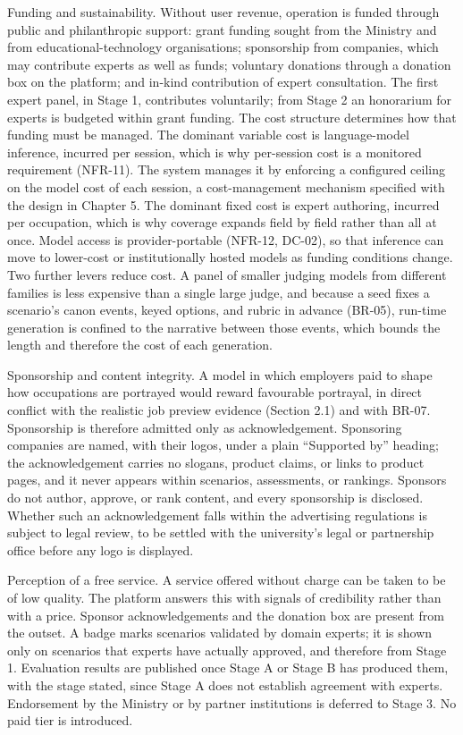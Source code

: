 Funding and sustainability. Without user revenue, operation is funded through public and philanthropic support: grant funding sought from the Ministry and from educational-technology organisations; sponsorship from companies, which may contribute experts as well as funds; voluntary donations through a donation box on the platform; and in-kind contribution of expert consultation. The first expert panel, in Stage 1, contributes voluntarily; from Stage 2 an honorarium for experts is budgeted within grant funding. The cost structure determines how that funding must be managed. The dominant variable cost is language-model inference, incurred per session, which is why per-session cost is a monitored requirement (NFR-11). The system manages it by enforcing a configured ceiling on the model cost of each session, a cost-management mechanism specified with the design in Chapter 5. The dominant fixed cost is expert authoring, incurred per occupation, which is why coverage expands field by field rather than all at once. Model access is provider-portable (NFR-12, DC-02), so that inference can move to lower-cost or institutionally hosted models as funding conditions change. Two further levers reduce cost. A panel of smaller judging models from different families is less expensive than a single large judge\cite{r74}, and because a seed fixes a scenario's canon events, keyed options, and rubric in advance (BR-05), run-time generation is confined to the narrative between those events, which bounds the length and therefore the cost of each generation.

Sponsorship and content integrity. A model in which employers paid to shape how occupations are portrayed would reward favourable portrayal, in direct conflict with the realistic job preview evidence (Section 2.1) and with BR-07. Sponsorship is therefore admitted only as acknowledgement. Sponsoring companies are named, with their logos, under a plain ``Supported by'' heading; the acknowledgement carries no slogans, product claims, or links to product pages, and it never appears within scenarios, assessments, or rankings. Sponsors do not author, approve, or rank content, and every sponsorship is disclosed. Whether such an acknowledgement falls within the advertising regulations is subject to legal review, to be settled with the university's legal or partnership office before any logo is displayed.

Perception of a free service. A service offered without charge can be taken to be of low quality. The platform answers this with signals of credibility rather than with a price. Sponsor acknowledgements and the donation box are present from the outset. A badge marks scenarios validated by domain experts; it is shown only on scenarios that experts have actually approved, and therefore from Stage 1. Evaluation results are published once Stage A or Stage B has produced them, with the stage stated, since Stage A does not establish agreement with experts. Endorsement by the Ministry or by partner institutions is deferred to Stage 3. No paid tier is introduced.

